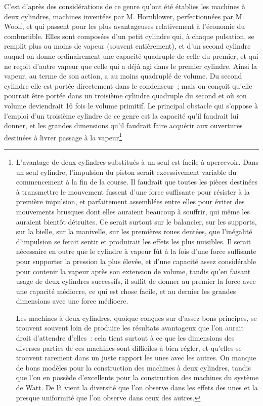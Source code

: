 \documentclass[french,twoside]{book} %
\begin{document}
C’est d’après des considérations de ce genre qu’ont été établies les machines à deux cylindres, machines inventées par M. Hornblower, perfectionnées par M. Woolf, et qui passent pour les plus avantageuses relativement à l’économie du combustible. Elles sont composées d’un petit cylindre qui, à chaque pulsation, se remplit plus ou moins de vapeur (souvent entièrement), et d’un second cylindre auquel on donne ordinairement une capacité quadruple de celle du premier, et qui ne reçoit d’autre vapeur que celle qui a déjà agi dans le premier cylindre. Ainsi la vapeur, au terme de son action, a au moins quadruplé de volume. Du second cylindre elle est portée directement dans le condenseur ; mais on conçoit qu’elle pourrait être portée dans un troisième cylindre quadruple du second et où son volume deviendrait 16 fois le volume primitif. Le principal obstacle qui s’oppose à l’emploi d’un troisième cylindre de ce genre est la capacité qu’il faudrait lui donner, et les grandes dimensions qu’il faudrait faire acquérir aux ouvertures destinées à livrer passage à la vapeur\footnote{ \noindent L’avantage de deux cylindres substitués à un seul est facile à apercevoir. Dans un seul cylindre, l’impulsion du piston serait excessivement variable du commencement à la fin de la course. Il faudrait que toutes les pièces destinées à transmettre le mouvement fussent d’une force suffisante pour résister à la première impulsion, et parfaitement assemblées entre elles pour éviter des mouvements brusques dont elles auraient beaucoup à souffrir, qui même les auraient bientôt détruites. Ce serait surtout sur le balancier, sur les supports, sur la bielle, sur la manivelle, sur les premières roues dentées, que l’inégalité d’impulsion se ferait sentir et produirait les effets les plus nuisibles. Il serait nécessaire en outre que le cylindre à vapeur fût à la fois d’une force suffisante pour supporter la pression la plus élevée, et d’une capacité assez considérable pour contenir la vapeur après son extension de volume, tandis qu’en faisant usage de deux cylindres successifs, il suffit de donner au premier la force avec une capacité médiocre, ce qui est chose facile, et au dernier les grandes dimensions avec une force médiocre.\par
 Les machines à deux cylindres, quoique conçues sur d’assez bons principes, se trouvent souvent loin de produire les résultats avantageux que l’on aurait droit d’attendre d’elles : cela tient surtout à ce que les dimensions des diverses parties de ces machines sont difficiles à bien régler, et qu’elles se trouvent rarement dans un juste rapport les unes avec les autres. On manque de bons modèles pour la construction des machines à deux cylindres, tandis que l’on en possède d’excellents pour la construction des machines du système de Watt. De là vient la diversité que l’on observe dans les effets des unes et la presque uniformité que l’on observe dans ceux des autres.
}
\end{document}
